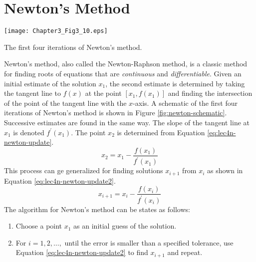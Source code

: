 \section{Newton's Method}

\begin{marginfigure}
\texttt{[image: Chapter3\_Fig3\_10.eps]}
\caption{The first four iterations of Newton's method.}
\label{fig:newton-schematic}
\end{marginfigure}
Newton's method, also called the Newton-Raphson method, is a classic method for finding roots of equations that are \emph{continuous} and \emph{differentiable}. Given an initial estimate of the solution $x_1$, the second estimate is determined by taking the tangent line to $f(x)$ at the point $[x_1,f(x_1)]$ and finding the intersection of the point of the tangent line with the $x$-axis. A schematic of the first four iterations of Newton's method is shown in Figure \ref{fig:newton-schematic}.  Successive estimates are found in the same way.  The slope of the tangent line at $x_1$ is denoted $f^{\prime}(x_1)$.  The point $x_2$ is determined from Equation \ref{eq:lec4n-newton-update}.
\begin{equation}
x_2 = x_1 - \frac{f(x_1)}{f^{\prime}(x_1)}
\label{eq:lec4n-newton-update}
\end{equation}
This process can ge generalized for finding solutions $x_{i+1}$ from $x_i$ as shown in Equation \ref{eq:lec4n-newton-update2}.
\begin{equation}
x_{i+1} = x_{i} - \frac{f(x_i)}{f^{\prime}(x_i)}
\label{eq:lec4n-newton-update2}
\end{equation}
The algorithm for Newton's method can be states as follows:
\begin{enumerate}
\item Choose a point $x_1$ as an initial guess of the solution.
\item For $i = 1,2,\dots,$ until the error is smaller than a specified tolerance, use Equation \ref{eq:lec4n-newton-update2} to find $x_{i+1}$ and repeat.
\end{enumerate}



